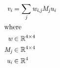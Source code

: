 \documentclass[12pt]{article}
\begin{document}
\begin{center}
\resizebox{\textwidth}{!} 
{
\begin{minipage}[c]{\textwidth}
\begin{align*}
\textit{v}_{ \textit{i} } & = \sum_\textit{j} \textit{w}_{\textit{i}, \textit{j}}\textit{M}_{ \textit{j} }\textit{u}_{ \textit{i} } \\
\intertext{where} 
\textit{w} & \in \mathbb{R}^{ 4 \times 4 } \\
\textit{M}_{\textit{j}} & \in \mathbb{R}^{ 4 \times 4 } \\
\textit{u}_{\textit{i}} & \in \mathbb{R}^{ 4} \\
\\
\end{align*}
\end{minipage}
}
\end{center}
\end{document}
